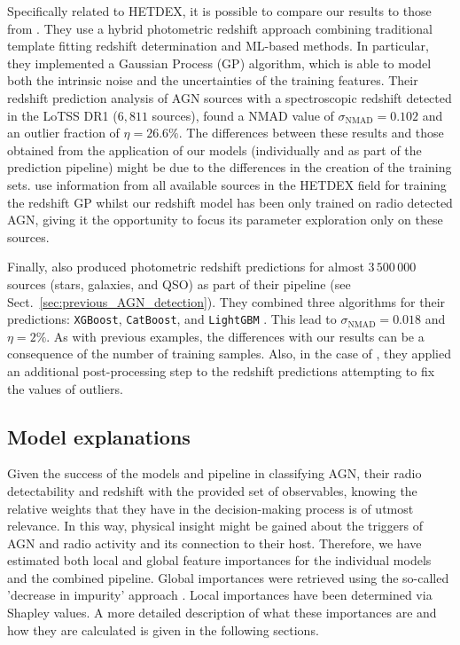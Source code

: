\documentclass{aa}
\begin{document}
Specifically related to HETDEX, it is possible to compare our results to those from \citet{2019A&A...622A...3D}. They use a hybrid photometric redshift approach combining  traditional template fitting redshift determination and ML-based methods. In particular, they implemented a Gaussian Process (GP) algorithm, which is able to model both the intrinsic noise and the uncertainties of the training features. Their redshift prediction analysis of 
AGN sources with a spectroscopic redshift detected in the LoTSS DR1 ($6,811$ sources),  found a NMAD value of ${\sigma_{\mathrm{NMAD}} = 0.102}$ and an outlier fraction of ${\eta = 26.6 \%}$.
The differences between these results and those obtained from the application of our models (individually and as part of the prediction pipeline) might be due to the differences in the creation of the training sets. \citet{2019A&A...622A...3D} use information from all available sources in the HETDEX field for training the redshift GP whilst our redshift model has been only trained on radio detected AGN, giving it the opportunity to focus its parameter exploration only on these sources.

Finally, \citet{2022A&A...666A..87C} also produced photometric redshift predictions for almost $3\,500\,000$ sources (stars, galaxies, and QSO) as part of their pipeline (see Sect.~\ref{sec:previous_AGN_detection}). They combined three algorithms for their predictions: \texttt{XGBoost}, \texttt{CatBoost}, and \texttt{LightGBM} \citep{NIPS2017_6449f44a}. This lead to ${\sigma_{\mathrm{NMAD}} = 0.018}$ and ${\eta = 2 \%}$. As with previous examples, the differences with our results can be a consequence of the number of training samples. Also, in the case of \citet{2022A&A...666A..87C}, they applied an additional post-processing step to the redshift predictions attempting to fix the values of outliers.

\subsection{Model explanations}\label{sec:model_explain}

Given the success of the models and pipeline in classifying AGN, their radio detectability and redshift with the provided set of observables, knowing the relative weights that they have in the decision-making process is of utmost relevance. In this way, physical insight might be gained about the triggers of AGN and radio activity and its connection to their host.
Therefore, we have estimated both local and global feature importances for the individual models and the combined pipeline. Global importances were retrieved using the so-called 'decrease in impurity' approach \citep[see, for example,][]{Breiman2001}. Local importances have been determined via Shapley values. A more detailed description of what these importances are and how they are calculated is given in the following sections.
\end{document}
